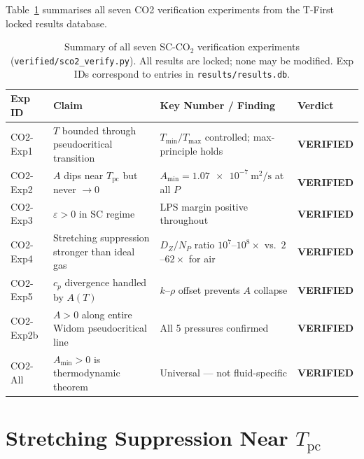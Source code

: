 \documentclass[12pt,a4paper]{article}
\newcommand{\eps}{\varepsilon}
\newcommand{\Tc}{T_{\mathrm{pc}}}   %
\newcommand{\Amin}{A_{\min}}
\newcommand{\DZ}{D_Z}               %
\newcommand{\NP}{N_P}               %
\begin{document}
Table~\ref{tab:all_exps} summarises all seven CO2 verification experiments from
the T-First locked results database.

\begin{table}[htbp]
  \centering
  \caption{Summary of all seven SC-CO$_2$ verification experiments
    (\texttt{verified/sco2\_verify.py}).  All results are locked; none may be
    modified.  Exp IDs correspond to entries in \texttt{results/results.db}.}
  \label{tab:all_exps}
  \smallskip
  \begin{tabular}{llp{5cm}l}
  \toprule
  {Exp ID} & {Claim} & {Key Number / Finding} & {Verdict} \\
  \midrule
  CO2-Exp1  & $T$ bounded through pseudocritical transition &
              $T_{\min}/T_{\max}$ controlled; max-principle holds &
              \textbf{VERIFIED} \\[4pt]
  CO2-Exp2  & $A$ dips near $\Tc$ but never $\to 0$ &
              $\Amin = \SI{1.07e-7}{\metre\squared\per\second}$ at all $P$ &
              \textbf{VERIFIED} \\[4pt]
  CO2-Exp3  & $\eps > 0$ in SC regime &
              LPS margin positive throughout &
              \textbf{VERIFIED} \\[4pt]
  CO2-Exp4  & Stretching suppression stronger than ideal gas &
              $\DZ/\NP$ ratio $10^7$--$10^8\times$ vs.\ $2$--$62\times$ for air &
              \textbf{VERIFIED} \\[4pt]
  CO2-Exp5  & $c_p$ divergence handled by $A(T)$ &
              $k$--$\rho$ offset prevents $A$ collapse &
              \textbf{VERIFIED} \\[4pt]
  CO2-Exp2b & $A > 0$ along entire Widom pseudocritical line &
              All 5 pressures confirmed &
              \textbf{VERIFIED} \\[4pt]
  CO2-All   & $\Amin > 0$ is thermodynamic theorem &
              Universal --- not fluid-specific &
              \textbf{VERIFIED} \\
  \bottomrule
  \end{tabular}
\end{table}

\section{Stretching Suppression Near $\Tc$}
\label{sec:stretching}
\end{document}
